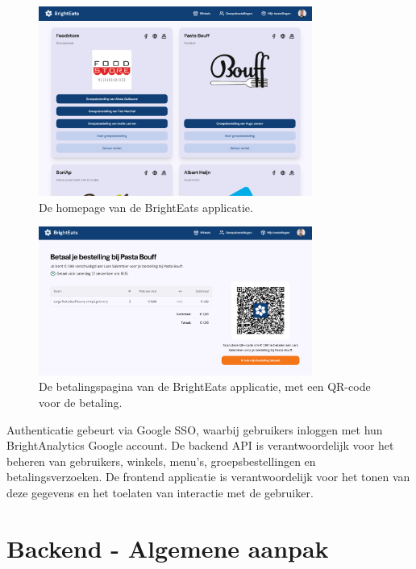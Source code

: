 \begin{figure}[H]
    \centering
    \includegraphics[width=0.8\textwidth]{brighteats.png}
    \caption{De homepage van de BrightEats applicatie.}
    \label{fig:brighteats}
\end{figure}

\begin{figure}[H]
    \centering
    \includegraphics[width=0.8\textwidth]{brighteats-payment-page.png}
    \caption{De betalingspagina van de BrightEats applicatie, met een QR-code voor de betaling.}
    \label{fig:brighteats-shop}
\end{figure}

\bigskip

Authenticatie gebeurt via Google SSO, waarbij gebruikers inloggen met hun BrightAnalytics Google account. De backend API is verantwoordelijk voor het beheren van gebruikers, winkels, menu's, groepsbestellingen en betalingsverzoeken. De frontend applicatie is verantwoordelijk voor het tonen van deze gegevens en het toelaten van interactie met de gebruiker.

\section{Backend - Algemene aanpak}


